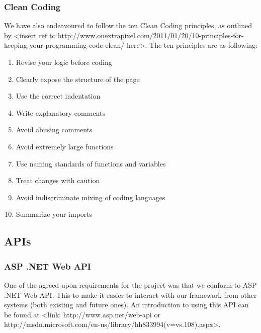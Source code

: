 \subsubsection{Clean Coding}
We have also endeavoured to follow the ten Clean Coding principles, as outlined by <insert ref to http://www.onextrapixel.com/2011/01/20/10-principles-for-keeping-your-programming-code-clean/ here>.
The ten principles are as following:
\begin{enumerate}

\item Revise your logic before coding
\item Clearly expose the structure of the page
\item Use the correct indentation
\item Write explanatory comments
\item Avoid abusing comments
\item Avoid extremely large functions
\item Use naming standards of functions and variables
\item Treat changes with caution
\item Avoid indiscriminate mixing of coding languages
\item Summarize your imports

\end{enumerate}

\subsection{APIs}
\subsubsection{ASP .NET Web API}
One of the agreed upon requirements for the project was that we conform to ASP .NET Web API. This to make it easier to interact with our framework from other systems (both existing and future ones). An introduction to using this API can be found at <link: http://www.asp.net/web-api or http://msdn.microsoft.com/en-us/library/hh833994(v=vs.108).aspx>.
